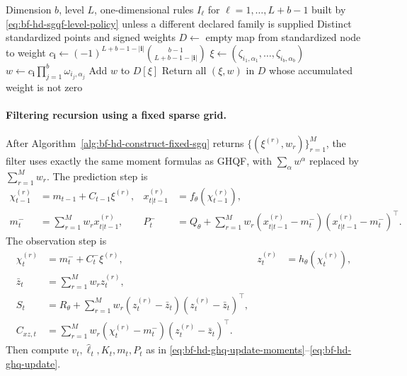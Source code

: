 \begin{algorithm}
\caption{ConstructFixedSparseGrid}
\label{alg:bf-hd-construct-fixed-sgq}
\begin{algorithmic}[1]
\Require Dimension \(b\), level \(L\), one-dimensional rules \(I_\ell\) for
\(\ell=1,\ldots,L+b-1\) built by \eqref{eq:bf-hd-sgqf-level-policy} unless a
different declared family is supplied
\Ensure Distinct standardized points and signed weights
\State \(D\gets\) empty map from standardized node to weight
  \State \(c_{\mathbf i}\gets
  (-1)^{L+b-1-|\mathbf i|}{b-1\choose L+b-1-|\mathbf i|}\)
    \State \(\xi\gets(\zeta_{i_1,\alpha_1},\ldots,\zeta_{i_b,\alpha_b})\)
    \State \(w\gets c_{\mathbf i}\prod_{j=1}^b\omega_{i_j,\alpha_j}\)
    \State Add \(w\) to \(D[\xi]\)
  \EndFor
\EndFor
\State Return all \((\xi,w)\) in \(D\) whose accumulated weight is not zero
\end{algorithmic}
\end{algorithm}

\paragraph{Filtering recursion using a fixed sparse grid.}
After Algorithm~\ref{alg:bf-hd-construct-fixed-sgq} returns
\(\{(\xi^{(r)},w_r)\}_{r=1}^{M}\), the filter uses exactly the same moment
formulas as GHQF, with \(\sum_\alpha w^\alpha\) replaced by \(\sum_{r=1}^M w_r\).
The prediction step is
\begin{align}
  \chi_{t-1}^{(r)}&=m_{t-1}+C_{t-1}\xi^{(r)},&
  x_{t|t-1}^{(r)}&=f_\theta(\chi_{t-1}^{(r)}),\\
  m_t^-&=\sum_{r=1}^Mw_rx_{t|t-1}^{(r)},&
  P_t^-&=Q_\theta+
  \sum_{r=1}^Mw_r
  (x_{t|t-1}^{(r)}-m_t^-)(x_{t|t-1}^{(r)}-m_t^-)^\top .
  \label{eq:bf-hd-sgqf-predict}
\end{align}
The observation step is
\begin{align}
  \chi_t^{(r)}&=m_t^-+C_t^-\xi^{(r)},&
  z_t^{(r)}&=h_\theta(\chi_t^{(r)}),\\
  \bar z_t&=\sum_{r=1}^Mw_rz_t^{(r)},\\
  S_t&=R_\theta+\sum_{r=1}^Mw_r
  (z_t^{(r)}-\bar z_t)(z_t^{(r)}-\bar z_t)^\top,\\
  C_{xz,t}&=\sum_{r=1}^Mw_r
  (\chi_t^{(r)}-m_t^-)(z_t^{(r)}-\bar z_t)^\top .
  \label{eq:bf-hd-sgqf-observation}
\end{align}
Then compute \(v_t,\widehat\ell_t,K_t,m_t,P_t\) as in
\eqref{eq:bf-hd-ghq-update-moments}--\eqref{eq:bf-hd-ghq-update}.

